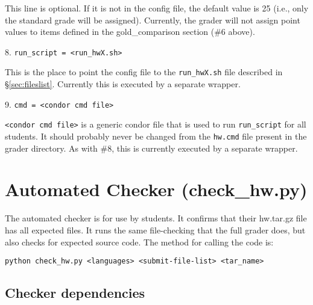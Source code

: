 \documentclass[12pt]{article}
\begin{document}
  This line is optional. If it is not in the config file, the default value is 25 (i.e., only the standard grade will be assigned). Currently, the grader will not assign point values to items defined in the gold\_comparison section (\#6 above).

\vspace{5pt}

8. \texttt{run\_script = <run\_hwX.sh>}

This is the place to point the config file to the \texttt{run\_hwX.sh} file described in \S\ref{sec:fileslist}. Currently this is executed by a separate wrapper.

\vspace{5pt}

9. \texttt{cmd = <condor cmd file>}

\texttt{<condor cmd file>} is a generic condor file that is used to run \texttt{run\_script} for all students. It should probably never be changed from the \texttt{hw.cmd} file present in the grader directory. As with \#8, this is currently executed by a separate wrapper.

\vspace{5pt}

\section{Automated Checker (check\_hw.py)} \label{sec:checker}

The automated checker is for use by students. It confirms that their hw.tar.gz file has all expected files. It runs the same file-checking that the full grader does, but also checks for expected source code. The method for calling the code is:

\texttt{python check\_hw.py <languages> <submit-file-list> <tar\_name>}

\subsection{Checker dependencies}
\end{document}
